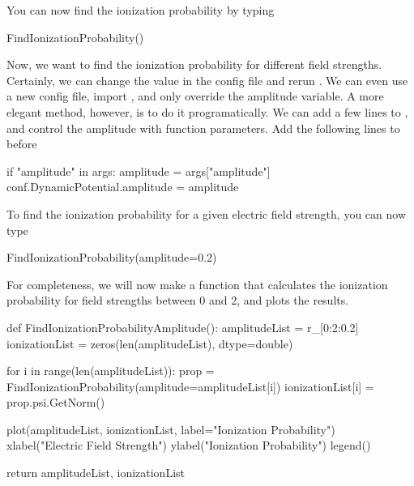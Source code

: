 You can now find the ionization probability by typing
\begin{python}
	FindIonizationProbability()
\end{python}
Now, we want to find the ionization probability for different field strengths. Certainly, we can change the value in the config file and rerun . We can even use a new config file, import , and only override the amplitude variable. A more elegant method, however, is to do it programatically. We can add a few lines to , and control the amplitude with function parameters. Add the following lines to  before 
\begin{python}
	if "amplitude" in args:
		amplitude = args["amplitude"]
		conf.DynamicPotential.amplitude = amplitude	
\end{python}
To find the ionization probability for a given electric field strength, you can now type
\begin{python}
 	FindIonizationProbability(amplitude=0.2)
\end{python}
For completeness, we will now make a function that calculates the ionization probability for field strengths between $0$ and $2$, and plots the results.
\begin{python}
def FindIonizationProbabilityAmplitude():
	amplitudeList = r_[0:2:0.2]
	ionizationList = zeros(len(amplitudeList), dtype=double)

	for i in range(len(amplitudeList)):
		prop = FindIonizationProbability(amplitude=amplitudeList[i])
		ionizationList[i] = prop.psi.GetNorm()

	plot(amplitudeList, ionizationList, label="Ionization Probability")
	xlabel("Electric Field Strength")
	ylabel("Ionization Probability")
	legend()

	return amplitudeList, ionizationList
\end{python}
